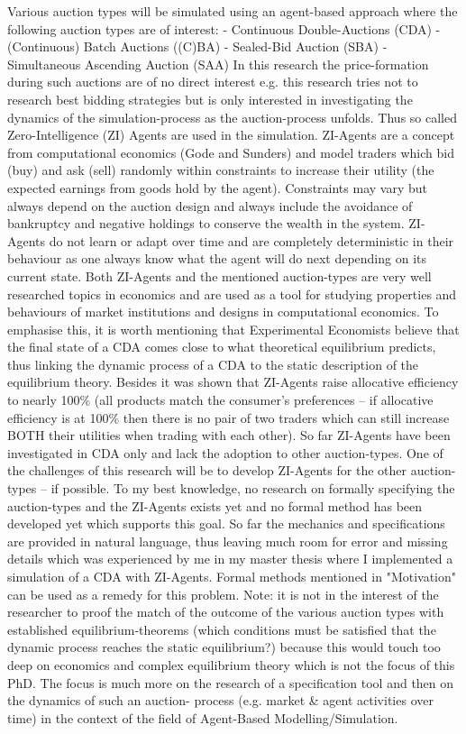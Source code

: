 \documentclass{article}
\begin{document}
Various auction types will be simulated using an agent-based approach where the following auction types are of interest:
- Continuous Double-Auctions (CDA)
- (Continuous) Batch Auctions ((C)BA)
- Sealed-Bid Auction (SBA)
- Simultaneous Ascending Auction (SAA)
In this research the price-formation during such auctions are of no direct interest e.g. this research tries not to research best bidding strategies but is only interested in investigating the dynamics of the simulation-process as the auction-process unfolds. Thus so called Zero-Intelligence (ZI) Agents are used in the simulation.
ZI-Agents are a concept from computational economics (Gode and Sunders) and model traders which bid (buy) and ask (sell) randomly within constraints to increase their utility (the expected earnings from goods hold by the agent). Constraints may vary but always depend on the auction design and always include the avoidance of bankruptcy and negative holdings to conserve the wealth in the system. ZI-Agents do not learn or adapt over time and are completely deterministic in their behaviour as one always know what the agent will do next depending on its current state.
Both ZI-Agents and the mentioned auction-types are very well researched topics in economics and are used as a tool for studying properties and behaviours of market institutions and designs in computational economics. To emphasise this, it is worth mentioning that Experimental Economists believe that the final state of a CDA comes close to what theoretical equilibrium predicts, thus linking the dynamic process of a CDA to the static description of the equilibrium theory. Besides it was shown that ZI-Agents raise allocative efficiency to nearly 100\% (all products match the consumer’s preferences – if allocative efficiency is at 100\% then there is no pair of two traders which can still increase BOTH their utilities when trading with each other).
So far ZI-Agents have been investigated in CDA only and lack the adoption to other auction-types. One of the challenges of this research will be to develop ZI-Agents for the other auction-types – if possible.
To my best knowledge, no research on formally specifying the auction-types and the ZI-Agents exists yet and no formal method has been developed yet which supports this goal. So far the mechanics and specifications are provided in natural language, thus leaving much room for error and missing details which was experienced by me in my master thesis where I implemented a simulation of a CDA with ZI-Agents. Formal methods mentioned in "Motivation" can be used as a remedy for this problem. 
Note: it is not in the interest of the researcher to proof the match of the outcome of the various auction types with established equilibrium-theorems (which conditions must be satisfied that the dynamic process reaches the static equilibrium?) because this would touch too deep on economics and complex equilibrium theory which is not the focus of this PhD. The focus is much more on the research of a specification tool and then on the dynamics of such an auction- process (e.g. market \& agent activities over time) in the context of the field of Agent-Based Modelling/Simulation.
\end{document}

